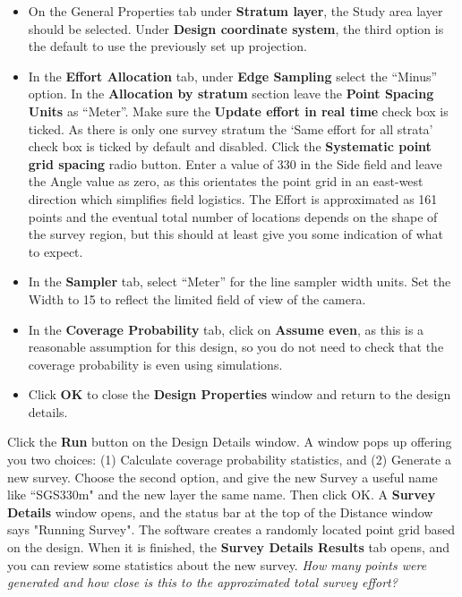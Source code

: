 \documentclass[a4paper, 10pt]{article}
\begin{document}
\begin{itemize}
	\item On the General Properties tab under \textbf{Stratum layer}, the Study area layer should be selected. Under \textbf{Design coordinate system}, the third option is the default to use the previously set up projection.
	\item In the \textbf{Effort Allocation} tab, under \textbf{Edge Sampling} select the “Minus” option. In the \textbf{Allocation by stratum} section leave the \textbf{Point Spacing Units} as “Meter”. Make sure the \textbf{Update effort in real time} check box is ticked. As there is only one survey stratum the ‘Same effort for all strata’ check box is ticked by default and disabled. Click the \textbf{Systematic point grid spacing} radio button. Enter a value of 330 in the Side field and leave the Angle value as zero, as this orientates the point grid in an east-west direction which simplifies field logistics. The Effort is approximated as 161 points and the eventual total number of locations depends on the shape of the survey region, but this should at least give you some indication of what to expect. 
	\item In the \textbf{Sampler} tab, select “Meter” for the line sampler width units. Set the Width to 15 to reflect the limited field of view of the camera.
	\item In the \textbf{Coverage Probability} tab, click on \textbf{Assume even}, as this is a reasonable assumption for this design, so you do not need to check that the coverage probability is even using simulations.
	\item Click \textbf{OK} to close the \textbf{Design Properties} window and return to the design details.
\end{itemize}

Click the \textbf{Run} button on the Design Details window. A window pops up offering you two choices: (1) Calculate coverage probability statistics, and (2) Generate a new survey.  Choose the second option, and give the new Survey a useful name like “SGS330m" and the new layer the same name. Then click OK. A \textbf{Survey Details} window opens, and the status bar at the top of the Distance window says "Running Survey". The software creates a randomly located point grid based on the design. When it is finished, the \textbf{Survey Details Results} tab opens, and you can review some statistics about the new survey. \emph{How many points were generated and how close is this to the approximated total survey effort?}
\end{document}
